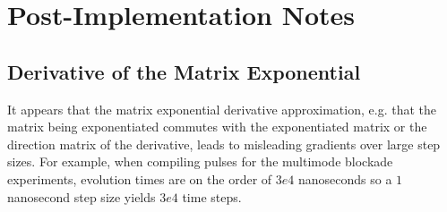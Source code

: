 \documentclass[letterpaper, 12pt]{article}
\begin{document}
\section{Post-Implementation Notes}

\subsection{Derivative of the Matrix Exponential}
It appears that the matrix exponential derivative approximation, e.g. that
the matrix being exponentiated commutes with the exponentiated matrix or the direction matrix of the
derivative, leads to misleading gradients over large step sizes. For example, when compiling pulses for
the multimode blockade experiments, evolution times are on the order of $3e4$ nanoseconds so a
$1$ nanosecond step size yields $3e4$ time steps.
\end{document}
